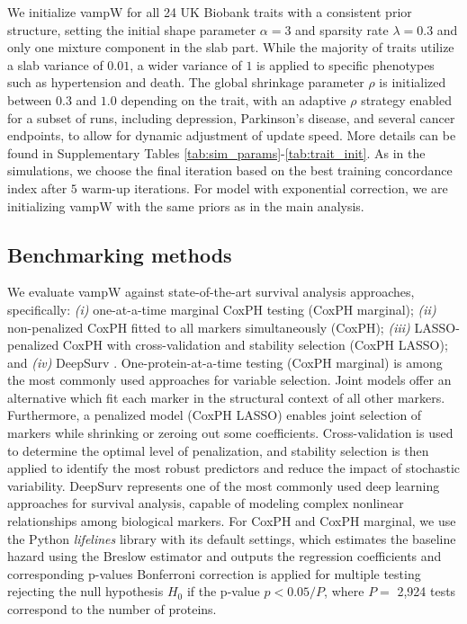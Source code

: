 We initialize vampW for all 24 UK Biobank traits with a consistent prior structure, setting the initial shape parameter $\alpha=3$ and sparsity rate $\lambda=0.3$ and only one mixture component in the slab part. While the majority of traits utilize a slab variance of $0.01$, a wider variance of $1$ is applied to specific phenotypes such as hypertension and death. The global shrinkage parameter $\rho$ is initialized between $0.3$ and $1.0$ depending on the trait, with an adaptive $\rho$ strategy enabled for a subset of runs, including depression, Parkinson's disease, and several cancer endpoints, to allow for dynamic adjustment of update speed. More details can be found in Supplementary Tables \ref{tab:sim_params}-\ref{tab:trait_init}. As in the simulations, we choose the final iteration based on the best training concordance index after $5$ warm-up iterations. For model with exponential correction, we are initializing vampW with the same priors as in the main analysis.

\subsection{Benchmarking methods}
\label{subsection:benchmarking}
We evaluate vampW against state-of-the-art survival analysis approaches, specifically: \emph{(i)} one-at-a-time marginal CoxPH testing (CoxPH marginal); \emph{(ii)} non-penalized CoxPH fitted to all markers simultaneously (CoxPH); \emph{(iii)} LASSO-penalized CoxPH \cite{tibshirani_lasso_1997} with cross-validation and stability selection (CoxPH LASSO); and  \emph{(iv)} DeepSurv \cite{katzman_deepsurv_2018}. One-protein-at-a-time testing (CoxPH marginal) is among the most commonly used approaches for variable selection. Joint models offer an alternative which fit each marker in the structural context of all other markers. Furthermore, a penalized model (CoxPH LASSO) enables joint selection of markers while shrinking or zeroing out some coefficients. Cross-validation is used to determine the optimal level of penalization, and stability selection is then applied to identify the most robust predictors and reduce the impact of stochastic variability. DeepSurv represents one of the most commonly used deep learning approaches for survival analysis, capable of modeling complex nonlinear relationships among biological markers. For CoxPH and CoxPH marginal, we use the Python \textit{lifelines} \cite{Davidson-Pilon2019} library with its default settings, which estimates the baseline hazard using the Breslow estimator and outputs the regression coefficients and corresponding p-values  Bonferroni correction is applied for multiple testing rejecting the null hypothesis $H_0$ if the p-value $p < 0.05/P$, where $P=$ 2,924 tests correspond to the number of proteins.

